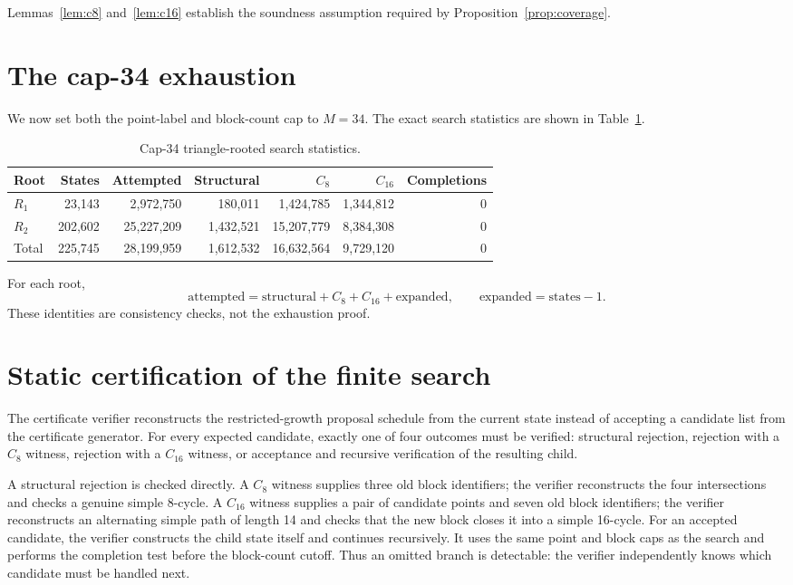 \documentclass[11pt]{article}
\theoremstyle{remark}
\newcommand{\Ceight}{C_8}
\newcommand{\Csixteen}{C_{16}}
\begin{document}
Lemmas~\ref{lem:c8} and~\ref{lem:c16} establish the soundness assumption required by Proposition~\ref{prop:coverage}.

\section{The cap-34 exhaustion}\label{sec:cap34}

We now set both the point-label and block-count cap to \(M=34\).  The exact search statistics are shown in Table~\ref{tab:counts}.

\begin{table}[ht]
\centering
\small
\begin{tabular}{lrrrrrr}
\toprule
Root & States & Attempted & Structural & \(\Ceight\) & \(\Csixteen\) & Completions\\
\midrule
\(R_1\) & 23,143 & 2,972,750 & 180,011 & 1,424,785 & 1,344,812 & 0\\
\(R_2\) & 202,602 & 25,227,209 & 1,432,521 & 15,207,779 & 8,384,308 & 0\\
\midrule
Total & 225,745 & 28,199,959 & 1,612,532 & 16,632,564 & 9,729,120 & 0\\
\bottomrule
\end{tabular}
\caption{Cap-34 triangle-rooted search statistics.}
\label{tab:counts}
\end{table}

For each root,
\[
\text{attempted}=\text{structural}+\Ceight+\Csixteen+\text{expanded},
\qquad
\text{expanded}=\text{states}-1.
\]
These identities are consistency checks, not the exhaustion proof.

\section{Static certification of the finite search}\label{sec:certificate}

The certificate verifier reconstructs the restricted-growth proposal schedule from the current state instead of accepting a candidate list from the certificate generator.  For every expected candidate, exactly one of four outcomes must be verified: structural rejection, rejection with a \(\Ceight\) witness, rejection with a \(\Csixteen\) witness, or acceptance and recursive verification of the resulting child.

A structural rejection is checked directly.  A \(\Ceight\) witness supplies three old block identifiers; the verifier reconstructs the four intersections and checks a genuine simple 8-cycle.  A \(\Csixteen\) witness supplies a pair of candidate points and seven old block identifiers; the verifier reconstructs an alternating simple path of length 14 and checks that the new block closes it into a simple 16-cycle.  For an accepted candidate, the verifier constructs the child state itself and continues recursively.  It uses the same point and block caps as the search and performs the completion test before the block-count cutoff.  Thus an omitted branch is detectable: the verifier independently knows which candidate must be handled next.
\end{document}
